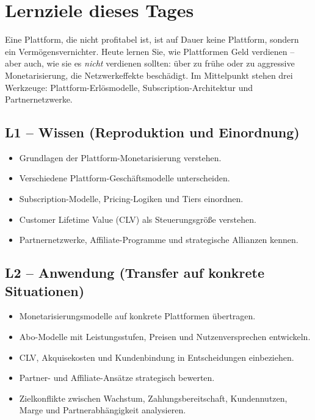 \documentclass[11pt,a4paper,oneside]{article}
\begin{document}
\section*{Lernziele dieses Tages}
\thispagestyle{plain}

\noindent Eine Plattform, die nicht profitabel ist, ist auf Dauer keine Plattform, sondern ein Vermögensvernichter. Heute lernen Sie, wie Plattformen Geld verdienen -- aber auch, wie sie es \emph{nicht} verdienen sollten: über zu frühe oder zu aggressive Monetarisierung, die Netzwerkeffekte beschädigt. Im Mittelpunkt stehen drei Werkzeuge: Plattform-Erlösmodelle, Subscription-Architektur und Partnernetzwerke.

\subsection*{L1 -- Wissen (Reproduktion und Einordnung)}
\begin{itemize}
  \item Grundlagen der Plattform-Monetarisierung verstehen.
  \item Verschiedene Plattform-Geschäftsmodelle unterscheiden.
  \item Subscription-Modelle, Pricing-Logiken und Tiers einordnen.
  \item Customer Lifetime Value (CLV) als Steuerungsgröße verstehen.
  \item Partnernetzwerke, Affiliate-Programme und strategische Allianzen kennen.
\end{itemize}

\subsection*{L2 -- Anwendung (Transfer auf konkrete Situationen)}
\begin{itemize}
  \item Monetarisierungsmodelle auf konkrete Plattformen übertragen.
  \item Abo-Modelle mit Leistungsstufen, Preisen und Nutzenversprechen entwickeln.
  \item CLV, Akquisekosten und Kundenbindung in Entscheidungen einbeziehen.
  \item Partner- und Affiliate-Ansätze strategisch bewerten.
  \item Zielkonflikte zwischen Wachstum, Zahlungsbereitschaft, Kundennutzen, Marge und Partnerabhängigkeit analysieren.
\end{itemize}
\end{document}
